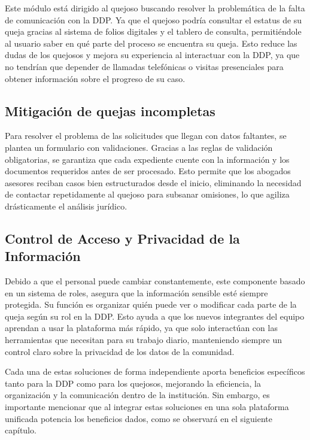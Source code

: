 \begin{flushleft}
Este módulo está dirigido al quejoso buscando resolver la problemática de la falta de comunicación con la DDP. Ya que el quejoso podría consultar el estatus de su queja gracias al sistema de folios digitales y el tablero de consulta, permitiéndole al usuario saber en qué parte del proceso se encuentra su queja. Esto reduce las dudas de los quejosos y mejora su experiencia al interactuar con la DDP, ya que no tendrían que depender de llamadas telefónicas o visitas presenciales para obtener información sobre el progreso de su caso.

\subsection{Mitigación de quejas incompletas}
Para resolver el problema de las solicitudes que llegan con datos faltantes, se plantea un formulario con validaciones. Gracias a las reglas de validación obligatorias, se garantiza que cada expediente cuente con la información y los documentos requeridos antes de ser procesado. Esto permite que los abogados asesores reciban casos bien estructurados desde el inicio, eliminando la necesidad de contactar repetidamente al quejoso para subsanar omisiones, lo que agiliza drásticamente el análisis jurídico.

\subsection{Control de Acceso y Privacidad de la Información}

Debido a que el personal puede cambiar constantemente, este componente basado en un sistema de roles, asegura que la información sensible esté siempre protegida. Su función es organizar quién puede ver o modificar cada parte de la queja según su rol en la DDP. Esto ayuda a que los nuevos integrantes del equipo aprendan a usar la plataforma más rápido, ya que solo interactúan con las herramientas que necesitan para su trabajo diario, manteniendo siempre un control claro sobre la privacidad de los datos de la comunidad.

Cada una de estas soluciones de forma independiente aporta beneficios específicos tanto para la DDP como para los quejosos, mejorando la eficiencia, la organización y la comunicación dentro de la institución. 
Sin embargo, es importante mencionar que al integrar estas soluciones en una sola plataforma unificada potencia los beneficios dados, como se observará en el siguiente capítulo.
\end{flushleft}